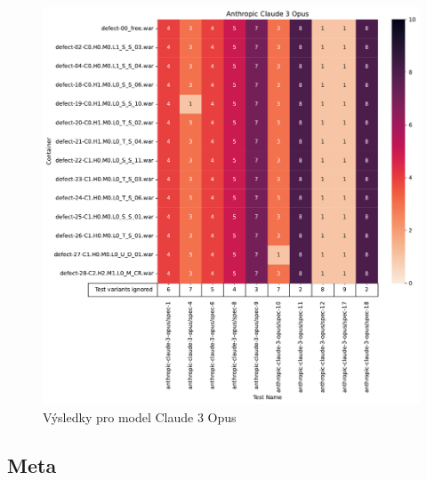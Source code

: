 \documentclass[czech, ma, kiv, he, iso690alph, pdf, viewonly]{fasthesis}
\begin{document}
            \begin{figure}[H]
                \includegraphics[width=\textwidth]{pic/claude-3-opus-results.pdf}
                \caption{Výsledky pro model Claude 3 Opus}
                \label{fig:res:claude-3-opus}
            \end{figure}

        \subsection{Meta} \label{sec:res:meta}
\end{document}
